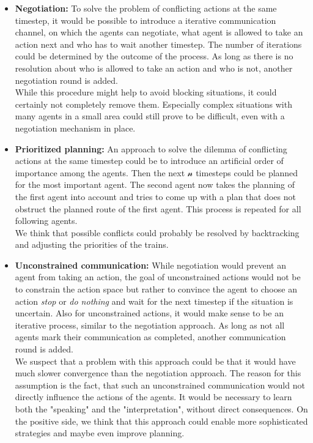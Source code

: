 \begin{itemize}
	\item \textbf{Negotiation:} To solve the problem of conflicting actions at the same timestep, it would be possible to introduce a iterative communication channel, on which the agents can negotiate, what agent is allowed to take an action next and who has to wait another timestep. The number of iterations could be determined by the outcome of the process. As long as there is no resolution about who is allowed to take an action and who is not, another negotiation round is added.\\
	While this procedure might help to avoid blocking situations, it could certainly not completely remove them. Especially complex situations with many agents in a small area could still prove to be difficult, even with a negotiation mechanism in place.

	\item \textbf{Prioritized planning:} An approach to solve the dilemma of conflicting actions at the same timestep could be to introduce an artificial order of importance among the agents. Then the next $\mathcal{n}$ timesteps could be planned for the most important agent. The second agent now takes the planning of the first agent into account and tries to come up with a plan that does not obstruct the planned route of the first agent. This process is repeated for all following agents.\\
	We think that possible conflicts could probably be resolved by backtracking and adjusting the priorities of the trains.
	
	\item \textbf{Unconstrained communication:} While negotiation would prevent an agent from taking an action, the goal of unconstrained actions would not be to constrain the action space but rather to convince the agent to choose an action \textit{stop} or \textit{do nothing} and wait for the next timestep if the situation is uncertain. Also for unconstrained actions, it would make sense to be an iterative process, similar to the negotiation approach. As long as not all agents mark their communication as completed, another communication round is added.\\
	We suspect that a problem with this approach could be that it would have much slower convergence than the negotiation approach. The reason for this assumption is the fact, that such an unconstrained communication would not directly influence the actions of the agents. It would be necessary to learn both the "speaking" and the "interpretation", without direct consequences. On the positive side, we think that this approach could enable more sophisticated strategies and maybe even improve planning.
	

\end{itemize}
